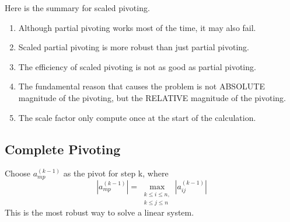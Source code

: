 	\begin{summary}
		Here is the summary for scaled pivoting.
		\begin{enumerate}
			\item Although partial pivoting works most of the time, it may also fail.
			\item Scaled partial pivoting is more robust than just partial pivoting.
			\item The efficiency of scaled pivoting is not as good as partial pivoting.
			\item The fundamental reason that causes the problem is not ABSOLUTE magnitude of the pivoting, but the RELATIVE magnitude of the pivoting.
			\item The scale factor only compute once at the start of the calculation.
		\end{enumerate}
	\end{summary}
	
	\subsection*{Complete Pivoting}
	Choose $a_{mp}^{(k-1)}$ as the pivot for step k, where 
	\[ |a_{mp}^{(k-1)}| = \max_{\substack{k\leq i\leq n,\\ k\leq j\leq n}} |a_{ij}^{(k-1)}| \]
	This is the most robust way to solve a linear system.
	  
